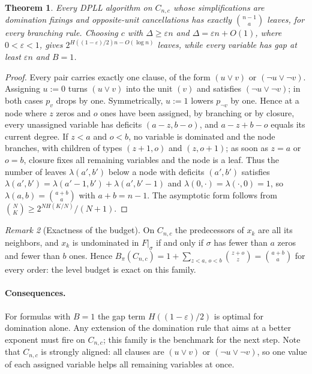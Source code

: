 \documentclass[11pt,a4paper]{article}
\newtheorem{theorem}{Theorem}
\theoremstyle{remark}
\newtheorem{remark}[theorem]{Remark}
\begin{document}
\begin{theorem}\label{thm:lower}
Every DPLL algorithm on $C_{n,c}$ whose simplifications are domination
fixings and opposite-unit cancellations has exactly $\binom{n-1}{a}$ leaves,
for every branching rule. Choosing $c$ with $\Delta\ge\varepsilon n$ and
$\Delta=\varepsilon n+O(1)$, where $0<\varepsilon<1$, gives
$2^{H((1-\varepsilon)/2)n-O(\log n)}$ leaves, while every variable has gap at
least $\varepsilon n$ and $B=1$.
\end{theorem}

\begin{proof}
Every pair carries exactly one clause, of the form $(u\lor v)$ or
$(\neg u\lor\neg v)$. Assigning $u:=0$ turns $(u\lor v)$ into the unit
$(v)$ and satisfies $(\neg u\lor\neg v)$; in both cases $p_v$ drops by one.
Symmetrically, $u:=1$ lowers $p_{\neg v}$ by one. Hence at a node where $z$
zeros and $o$ ones have been assigned, by branching or by closure, every
unassigned variable has deficits $(a-z,b-o)$, and $a-z+b-o$ equals its
current degree. If $z<a$ and $o<b$, no variable is dominated and the node
branches, with children of types $(z+1,o)$ and $(z,o+1)$; as soon as $z=a$
or $o=b$, closure fixes all remaining variables and the node is a leaf. Thus
the number of leaves $\lambda(a',b')$ below a node with deficits $(a',b')$
satisfies $\lambda(a',b')=\lambda(a'-1,b')+\lambda(a',b'-1)$ and
$\lambda(0,\cdot)=\lambda(\cdot,0)=1$, so $\lambda(a,b)=\binom{a+b}a$ with
$a+b=n-1$. The asymptotic form follows from
$\binom NK\ge2^{NH(K/N)}/(N+1)$.
\end{proof}

\begin{remark}[Exactness of the budget]\label{rem:exact}
On $C_{n,c}$ the predecessors of $x_k$ are all its neighbors, and $x_k$ is
undominated in $F|_\sigma$ if and only if $\sigma$ has fewer than $a$ zeros
and fewer than $b$ ones. Hence $B_\pi(C_{n,c})=1+\sum_{z<a,\,o<b}\binom{z+o}z
=\binom{a+b}a$ for every order: the level budget is exact on this family.
\end{remark}

\paragraph{Consequences.} For formulas with $B=1$ the gap term
$H((1-\varepsilon)/2)$ is optimal for domination alone. Any extension of the
domination rule that aims at a better exponent must fire on $C_{n,c}$; this
family is the benchmark for the next step. Note that $C_{n,c}$ is strongly
aligned: all clauses are $(u\lor v)$ or $(\neg u\lor\neg v)$, so one value of
each assigned variable helps all remaining variables at once.
\end{document}
